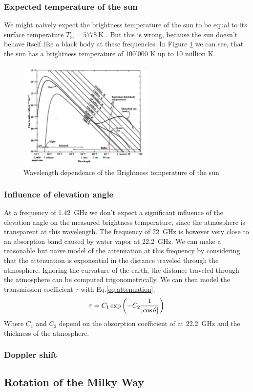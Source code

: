 \subsubsection{Expected temperature of the sun}\label{sec:sun_temp}
We might naively expect the brightness temperature of the sun to be equal to its surface temperature $T_{\odot} = \SI{5778}{\kelvin}$ \cite[p. 211]{durandi_formeln_2011}. But this is wrong, because the sun doesn't behave itself like a black body at these frequencies.
In Figure \ref{fig:sun_temp_theory} we can see, that the sun has a brightness temperature of 100'000 \si{\kelvin} up to 10 million \si{\kelvin}.
\begin{figure}[H]
    \centering
    \includegraphics[width=0.6\textwidth]{assets/SunBrightnessTheory.png}
    \caption{Wavelength dependence of the Brightness temperature of the sun \cite[p.8-45 Fig. 8-34]{kraus_radio_1986}}
    \label{fig:sun_temp_theory}
\end{figure}

\subsubsection{Influence of elevation angle}
At a frequency of \SI{1.42}{\giga\hertz} we don't expect a significant influence of the elevation angle on the measured brightness temperature, since the atmosphere is transparent at this wavelength.
The frequency of \SI{22}{\giga\hertz} is however very close to an absorption band caused by water vapor  at \SI{22.2}{\giga\hertz}.
We can make a reasonable but naive model of the attenuation at this frequency by considering that the attenuation is exponential in the distance traveled through the atmosphere.
Ignoring the curvature of the earth, the distance traveled through the atmosphere can be computed trigonometrically. We can then model the transmission coefficient $\tau$ with Eq.\eqref{eq:attenuation}.
\begin{equation}
    \tau = C_1 \exp{\left( - C_2 \frac{1}{\left\lvert \cos{\theta}\right\rvert} \right)} \label{eq:attenuation}
\end{equation}
Where $C_1$ and $C_2$ depend on the absorption coefficient of  at \SI{22.2}{\giga\hertz} and the thickness of the atmosphere.



\subsubsection{Doppler shift}

\subsection{Rotation of the Milky Way}
